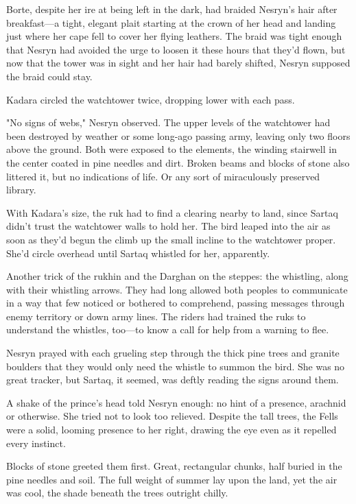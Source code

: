 Borte, despite her ire at being left in the dark, had braided Nesryn's hair after breakfast---a tight, elegant plait starting at the crown of her head and landing just where her cape fell to cover her flying leathers.
The braid was tight enough that Nesryn had avoided the urge to loosen it these hours that they'd flown, but now that the tower was in sight and her hair had barely shifted, Nesryn supposed the braid could stay.

Kadara circled the watchtower twice, dropping lower with each pass.

"No signs of webs," Nesryn observed.
The upper levels of the watchtower had been destroyed by weather or some long-ago passing army, leaving only two floors above the ground.
Both were exposed to the elements, the winding stairwell in the center coated in pine needles and dirt.
Broken beams and blocks of stone also littered it, but no indications of life.
Or any sort of miraculously preserved library.

With Kadara's size, the ruk had to find a clearing nearby to land, since Sartaq didn't trust the watchtower walls to hold her.
The bird leaped into the air as soon as they'd begun the climb up the small incline to the watchtower proper.
She'd circle overhead until Sartaq whistled for her, apparently.

Another trick of the rukhin and the Darghan on the steppes: the whistling, along with their whistling arrows.
They had long allowed both peoples to communicate in a way that few noticed or bothered to comprehend, passing messages through enemy territory or down army lines.
The riders had trained the ruks to understand the whistles, too---to know a call for help from a warning to flee.

Nesryn prayed with each grueling step through the thick pine trees and granite boulders that they would only need the whistle to summon the bird.
She was no great tracker, but Sartaq, it seemed, was deftly reading the signs around them.

A shake of the prince's head told Nesryn enough: no hint of a presence, arachnid or otherwise.
She tried not to look too relieved.
Despite the tall trees, the Fells were a solid, looming presence to her right, drawing the eye even as it repelled every instinct.

Blocks of stone greeted them first.
Great, rectangular chunks, half buried in the pine needles and soil.
The full weight of summer lay upon the land, yet the air was cool, the shade beneath the trees outright chilly.


